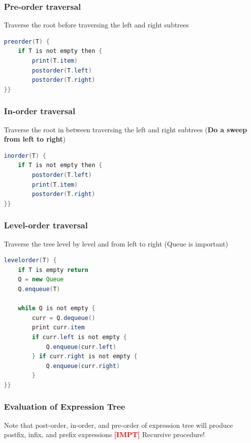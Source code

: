 \documentclass{article}
\newcommand{\impt}[0]{\textcolor{red}{\textbf{[IMPT] }}}
\begin{document}
\begin{multicols}{2}
\subsubsection{Pre-order traversal}
Traverse the root before traversing the left and right subtrees
\begin{lstlisting}[language=java]
preorder(T) {
	if T is not empty then {
		print(T.item)
		postorder(T.left)
		postorder(T.right)
}}
\end{lstlisting}
\subsubsection{In-order traversal}
Traverse the root in between traversing the left and right subtrees (\textbf{Do a sweep from left to right})
\begin{lstlisting}[language=java]
inorder(T) {
	if T is not empty then {
		postorder(T.left)
		print(T.item)
		postorder(T.right)
}}
\end{lstlisting}
\subsubsection{Level-order traversal}
Traverse the tree level by level and from left to right (Queue is important)
\begin{lstlisting}[language=java]
levelorder(T) {
	if T is empty return
	Q = new Queue
	Q.enqueue(T)

	while Q is not empty {
		curr = Q.dequeue()
		print curr.item
		if curr.left is not empty {
			Q.enqueue(curr.left)
		} if curr.right is not empty {
		    Q.enqueue(curr.right)
        }
}}
\end{lstlisting}
\subsubsection{Evaluation of Expression Tree}
Note that post-order, in-order, and pre-order of expression tree will produce postfix, infix, and prefix expressions
\impt Recursive procedure!


\end{multicols}
\end{document}
